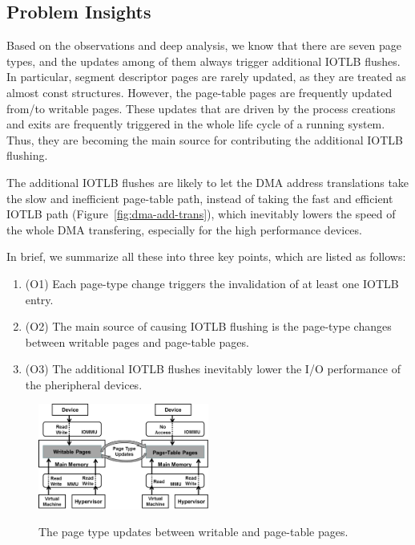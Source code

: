 \subsection{Problem Insights} \label{sec:insight}
Based on the observations and deep analysis, we know that there are seven page types, and the updates among of them always trigger additional IOTLB flushes. 
In particular, segment descriptor pages are rarely updated, as they are treated as almost const structures.  
However, the page-table pages are frequently updated from/to writable pages. 
These updates that are driven by the process creations and exits are frequently triggered in the whole life cycle of a running system.
Thus, they are becoming the main source for contributing the additional IOTLB flushing.

The additional IOTLB flushes are likely to let the DMA address 
translations take the slow and inefficient page-table path, 
instead of taking the fast and efficient IOTLB path (Figure~\ref{fig:dma-add-trans}), which inevitably lowers the 
speed of the whole DMA transfering, especially for the high performance devices.


In brief, we summarize all these into three key points, which are listed as follows:
\begin{enumerate}
\item (O1) Each page-type change triggers the invalidation of at least one IOTLB entry.
\item (O2) The main source of causing IOTLB flushing is the page-type changes between writable pages and page-table pages.
\item (O3) The additional IOTLB flushes inevitably lower the I/O performance of the pheripheral devices.
\end{enumerate}

\begin{figure}[ht]
\centering
\includegraphics[width=0.5\textwidth]{image/background/wr2pt.png} \\
\caption{The page type updates between writable and page-table pages.}
\label{fig:wr2pt}
\end{figure}


